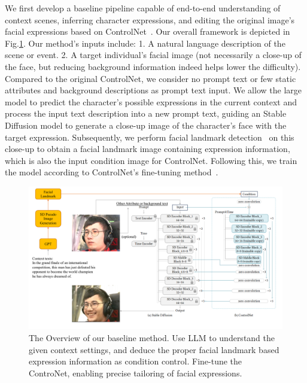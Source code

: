 We first develop a baseline pipeline capable of end-to-end understanding of context scenes, inferring character expressions, and editing the original image's facial expressions based on ControlNet~\cite{zhang2023adding}. Our overall framework is depicted in Fig.\ref{fig:framework}. Our method's inputs include: 1. A natural language description of the scene or event. 2. A target individual's facial image (not necessarily a close-up of the face, but reducing background information indeed helps lower the difficulty). Compared to the original ControlNet, we consider no prompt text or few static attributes and background descriptions as prompt text input. We allow the large model to predict the character's possible expressions in the current context and process the input text description into a new prompt text, guiding an Stable Diffusion model to generate a close-up image of the character's face with the target expression. Subsequently, we perform facial landmark detection~\cite{bulat2017far} on this close-up to obtain a facial landmark image containing expression information, which is also the input condition image for ControlNet. Following this, we train the model according to ControlNet's fine-tuning method~\cite{landmark}.

\begin{figure}[h!tp]
    \includegraphics[width=1.3\linewidth]{figs/baseline_framework_proposal.pdf}
    \caption{The Overview of our baseline method. Use LLM to understand the given context settings, and deduce the proper facial landmark based expression information as condition control. Fine-tune the ControNet, enabling precise tailoring of facial expressions.
    }
    \label{fig:framework}
\end{figure}

\vspace{-5mm}


